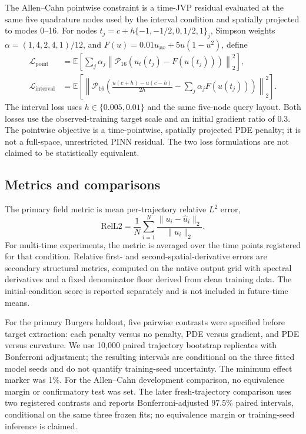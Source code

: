 \documentclass[a4paper,fleqn]{cas-sc}
\newcommand{\RelLTwo}{\mathrm{RelL2}}
\begin{document}
The Allen--Cahn pointwise constraint is a time-JVP residual evaluated at the same five quadrature nodes used by the interval condition and spatially projected to modes 0--16. For nodes $t_j=c+h\{-1,-1/2,0,1/2,1\}_j$, Simpson weights $\alpha=(1,4,2,4,1)/12$, and $F(u)=0.01u_{xx}+5u(1-u^2)$, define
\begin{align}
  \mathcal{L}_{\mathrm{point}} &= \mathbb{E}\!\left[\sum_j \alpha_j \left\|\mathcal{P}_{16}\left(u_t(t_j)-F(u(t_j))\right)\right\|_2^2\right], \\
  \mathcal{L}_{\mathrm{interval}} &= \mathbb{E}\!\left[\left\|\mathcal{P}_{16}\left(\frac{u(c+h)-u(c-h)}{2h}-\sum_j\alpha_jF(u(t_j))\right)\right\|_2^2\right].
  \label{eq:allen-losses}
\end{align}
The interval loss uses $h\in\{0.005,0.01\}$ and the same five-node query layout. Both losses use the observed-training target scale and an initial gradient ratio of 0.3. The pointwise objective is a time-pointwise, spatially projected PDE penalty; it is not a full-space, unrestricted PINN residual. The two loss formulations are not claimed to be statistically equivalent.

\subsection{Metrics and comparisons}
The primary field metric is mean per-trajectory relative $L^2$ error,
\begin{equation}
  \RelLTwo = \frac{1}{N}\sum_{i=1}^{N}\frac{\|u_i-\widehat u_i\|_2}{\|u_i\|_2}.
  \label{eq:rel-l2}
\end{equation}
For multi-time experiments, the metric is averaged over the time points registered for that condition. Relative first- and second-spatial-derivative errors are secondary structural metrics, computed on the native output grid with spectral derivatives and a fixed denominator floor derived from clean training data. The initial-condition score is reported separately and is not included in future-time means.

For the primary Burgers holdout, five pairwise contrasts were specified before target extraction: each penalty versus no penalty, PDE versus gradient, and PDE versus curvature. We use 10,000 paired trajectory bootstrap replicates with Bonferroni adjustment; the resulting intervals are conditional on the three fitted model seeds and do not quantify training-seed uncertainty. The minimum effect marker was 1\%. For the Allen--Cahn development comparison, no equivalence margin or confirmatory test was set. The later fresh-trajectory comparison uses two registered contrasts and reports Bonferroni-adjusted 97.5\% paired intervals, conditional on the same three frozen fits; no equivalence margin or training-seed inference is claimed.
\end{document}
